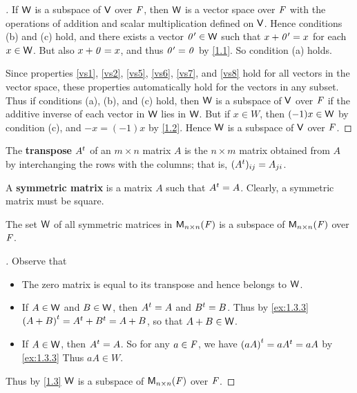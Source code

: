 \begin{proof}[]
  If \(\mathsf{W}\) is a subspace of \(\mathsf{V}\) over \(\mathit{F}\), then \(\mathsf{W}\) is a vector space over \(\mathit{F}\) with the operations of addition and scalar multiplication defined on \(\mathsf{V}\).
  Hence conditions (b) and (c) hold, and there exists a vector \(\mathit{0}' \in \mathsf{W}\) such that \(x + \mathit{0}' = x\) for each \(x \in \mathsf{W}\).
  But also \(x + \mathit{0} = x\), and thus \(\mathit{0}' = \mathit{0}\) by \cref{1.1}.
  So condition (a) holds.

  Since properties \ref{vs1}, \ref{vs2}, \ref{vs5}, \ref{vs6}, \ref{vs7}, and \ref{vs8} hold for all vectors in the vector space, these properties automatically hold for the vectors in any subset.
  Thus if conditions (a), (b), and (c) hold, then \(\mathsf{W}\) is a subspace of \(\mathsf{V}\) over \(\mathit{F}\) if the additive inverse of each vector in \(\mathsf{W}\) lies in \(\mathsf{W}\).
  But if \(x \in W\), then \((-1) x \in \mathsf{W}\) by condition (c), and \(-x = (-1) x\) by \cref{1.2}.
  Hence \(\mathsf{W}\) is a subspace of \(\mathsf{V}\) over \(\mathit{F}\).
\end{proof}

\begin{defn}\label{1.3.3}
  The \textbf{transpose} \({A}^{t}\) of an \(m \times n\) matrix \(A\) is the \(n \times m\) matrix obtained from \(A\) by interchanging the rows with the columns;
  that is, \(({A}^{t})_{i j} = A_{j i}\).
\end{defn}

\begin{defn}\label{1.3.4}
  A \textbf{symmetric matrix} is a matrix \(A\) such that \({A}^{t} = A\).
  Clearly, a symmetric matrix must be square.
\end{defn}

\begin{eg}\label{1.3.5}
  The set \(\mathsf{W}\) of all symmetric matrices in \(\mathsf{M}_{{n} \times n}({\mathit{F}})\) is a subspace of \(\mathsf{M}_{{n} \times n}({\mathit{F}})\) over \(\mathit{F}\).
\end{eg}

\begin{proof}[]
  Observe that
  \begin{itemize}
    \item The zero matrix is equal to its transpose and hence belongs to \(\mathsf{W}\).
    \item If \(A \in \mathsf{W}\) and \(B \in \mathsf{W}\), then \({A}^{t} = A\) and \({B}^{t} = B\).
          Thus by \cref{ex:1.3.3} \({(A + B)}^{t} = {A}^{t} + {B}^{t} = A + B\), so that \(A + B \in \mathsf{W}\).
    \item If \(A \in \mathsf{W}\), then \({A}^{t} = A\).
          So for any \(a \in \mathit{F}\), we have \({(aA)}^{t} = a{A}^{t} = aA\) by \cref{ex:1.3.3}
          Thus \(aA \in W\).
  \end{itemize}
  Thus by \cref{1.3} \(\mathsf{W}\) is a subspace of \(\mathsf{M}_{{n} \times n}({\mathit{F}})\) over \(\mathit{F}\).
\end{proof}

